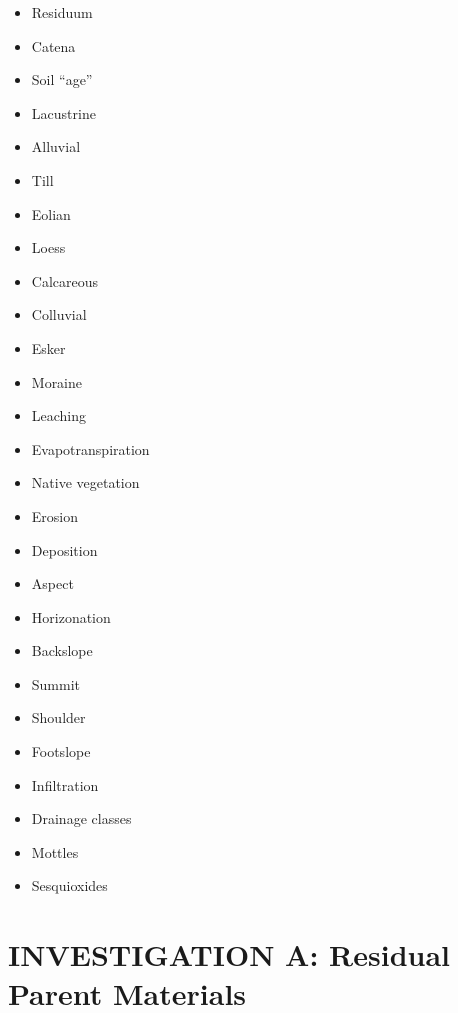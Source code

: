 \documentclass[
  letterpaper,
  twocolumn,
  portrait]{scrbook}
\providecommand{\tightlist}{%
  \setlength{\itemsep}{0pt}\setlength{\parskip}{0pt}}\usepackage{longtable,booktabs,array}
\begin{document}
\begin{tcolorbox}[enhanced jigsaw, colframe=quarto-callout-tip-color-frame, coltitle=black, arc=.35mm, breakable, bottomrule=.15mm, colback=white, rightrule=.15mm, toprule=.15mm, opacityback=0, bottomtitle=1mm, left=2mm, titlerule=0mm, leftrule=.75mm, opacitybacktitle=0.6, toptitle=1mm, title=\textcolor{quarto-callout-tip-color}{\faLightbulb}\hspace{0.5em}{Key Words \& Concepts}, colbacktitle=quarto-callout-tip-color!10!white]

\begin{itemize}
\tightlist
\item
  Residuum
\item
  Catena
\item
  Soil ``age''
\item
  Lacustrine
\item
  Alluvial
\item
  Till
\item
  Eolian
\item
  Loess
\item
  Calcareous
\item
  Colluvial
\item
  Esker
\item
  Moraine
\item
  Leaching
\item
  Evapotranspiration
\item
  Native vegetation
\item
  Erosion
\item
  Deposition
\item
  Aspect
\item
  Horizonation
\item
  Backslope
\item
  Summit
\item
  Shoulder
\item
  Footslope
\item
  Infiltration
\item
  Drainage classes
\item
  Mottles
\item
  Sesquioxides
\end{itemize}

\end{tcolorbox}

\hypertarget{investigation-a-residual-parent-materials}{%
\section{INVESTIGATION A: Residual Parent
Materials}\label{investigation-a-residual-parent-materials}}
\end{document}
